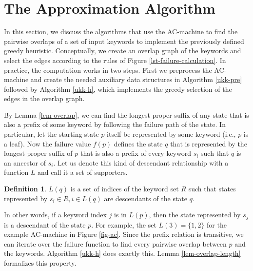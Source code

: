 \documentclass[english,twoside,censored,csm,algorithms-track-2020]{HYthesisML}
\theoremstyle{plain}
\theoremstyle{definition}
\newtheorem{definition}[theorem]{Definition}
\begin{document}

\section{The Approximation Algorithm}

In this section, we discuss the algorithms that use the AC-machine to find the pairwise overlaps
of a set of input keywords to implement the previously defined greedy heuristic. Conceptually,
we create an overlap graph of the keywords and select the edges according to the rules of
Figure \ref{lst-failure-calculation}. In practice, the computation works in two steps. First we
preprocess the AC-machine and create the needed auxiliary data structures in Algorithm \ref{ukk-pre}
followed by Algorithm \ref{ukk-h}, which implements the greedy selection of the edges in the
overlap graph.

By Lemma \ref{lem-overlap}, we can find the longest proper suffix of any state that is also
a prefix of some keyword by following the failure path of the state. In particular, let the starting
state $p$ itself be represented by some keyword (i.e., $p$ is a leaf). Now the failure value $f(p)$
defines the state $q$ that is represented by the longest proper suffix of $p$ that is also a prefix
of every keyword $s_i$ such that $q$ is an ancestor of $s_i$.
Let us denote this kind of descendant relationship with a function $L$ and call it a set of
supporters.

\begin{definition}
$L(q)$ is a set of indices of the keyword set $R$ such that states represented by
$s_i\in R, i\in L(q)$ are descendants of the state $q$.
\end{definition}

In other words, if a keyword index
$j$ is in $L(p)$, then the state represented by $s_j$ is a descendant of the state $p$.
For example, the set $L(3) = \{1,2\}$ for the example AC-machine in Figure \ref{fig-ac}.
Since the prefix relation is transitive, we can iterate over the failure function to find every
pairwise overlap between $p$ and the keywords. Algorithm \ref{ukk-h} does exactly this.
Lemma \ref{lem-overlap-length} formalizes this property.


\end{document}
